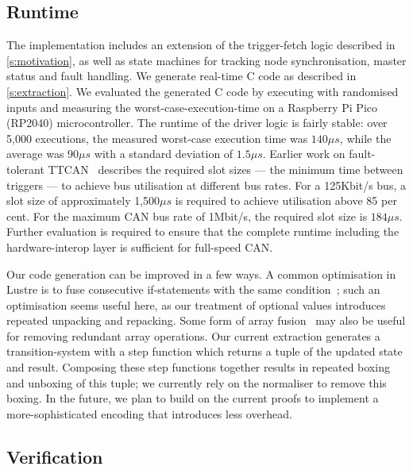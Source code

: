\subsection{Runtime}

The implementation includes an extension of the trigger-fetch logic described in \autoref{s:motivation}, as well as state machines for tracking node synchronisation, master status and fault handling.
We generate real-time C code as described in \autoref{s:extraction}.
We evaluated the generated C code by executing with randomised inputs and measuring the worst-case-execution-time on a Raspberry Pi Pico (RP2040) microcontroller.
The runtime of the driver logic is fairly stable: over 5,000 executions, the measured worst-case execution time was $140\mu{}s$, while the average was $90\mu{}s$ with a standard deviation of $1.5\mu{}s$.
Earlier work on fault-tolerant TTCAN~\cite{short2007fault} describes the required slot sizes --- the minimum time between triggers --- to achieve bus utilisation at different bus rates.
For a 125Kbit/s bus, a slot size of approximately 1,500$\mu{}s$ is required to achieve utilisation above 85 per cent.
For the maximum CAN bus rate of 1Mbit/s, the required slot size is $184\mu{}s$.
Further evaluation is required to ensure that the complete runtime including the hardware-interop layer is sufficient for full-speed CAN.

Our code generation can be improved in a few ways.
A common optimisation in Lustre is to fuse consecutive if-statements with the same condition~\cite{bourke2017formally}; such an optimisation seems useful here, as our treatment of optional values introduces repeated unpacking and repacking.
Some form of array fusion~\cite{robinson2017machine} may also be useful for removing redundant array operations.
Our current extraction generates a transition-system with a step function which returns a tuple of the updated state and result.
Composing these step functions together results in repeated boxing and unboxing of this tuple; we currently rely on the \fstar{} normaliser to remove this boxing.
In the future, we plan to build on the current proofs to implement a more-sophisticated encoding that introduces less overhead.

\subsection{Verification}

